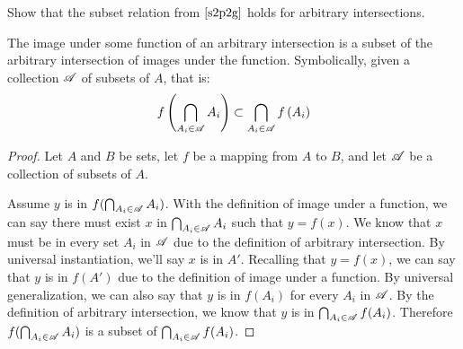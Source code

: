 \documentclass[main.tex]{subfiles}
\begin{document}
\subproblem{}\label{s2p3d}

Show that the subset relation from \(\ref{s2p2g}\) holds for arbitrary
intersections.

\begin{thm}
	The image under some function of an arbitrary intersection is a subset
	of the arbitrary intersection of images under the function.
	Symbolically, given a collection \(\mathscr{A}\) of subsets of \(A\),
	that is:
	\[f\left(\bigcap\limits_{A_i \in \mathscr{A}} {A_i}\right) \subset \bigcap\limits_{A_i \in \mathscr{A}} {f\left(A_i\right)}\]
\end{thm}
\begin{proof}
	Let \(A\) and \(B\) be sets, let \(f\) be a mapping from \(A\) to \(B\),
	and let \(\mathscr{A}\) be a collection of subsets of \(A\).

	Assume \(y\) is in
	\(f(\bigcap_{A_i \in \mathscr{A}} {A_i})\). With the
	definition of image under a function, we can say there must exist \(x\)
	in \(\bigcap_{A_i \in \mathscr{A}} {A_i}\) such that
	\(y = f(x)\). We know that \(x\) must be in every set \(A_i\) in
	\(\mathscr{A}\) due to the definition of arbitrary intersection. By
	universal instantiation, we'll say \(x\) is in \(A'\). Recalling that
	\(y = f(x)\), we can say that \(y\) is in \(f(A')\) due to the
	definition of image under a function. By universal generalization, we
	can also say that \(y\) is in \(f(A_i)\) for every \(A_i\) in
	\(\mathscr{A}\). By the definition of arbitrary intersection, we know
	that \(y\) is in
	\(\bigcap_{A_i \in \mathscr{A}} {f(A_i)}\). Therefore
	\(f(\bigcap_{A_i \in \mathscr{A}} {A_i})\) is a subset of
	\(\bigcap_{A_i \in \mathscr{A}} {f(A_i)}\).
\end{proof}
\end{document}
